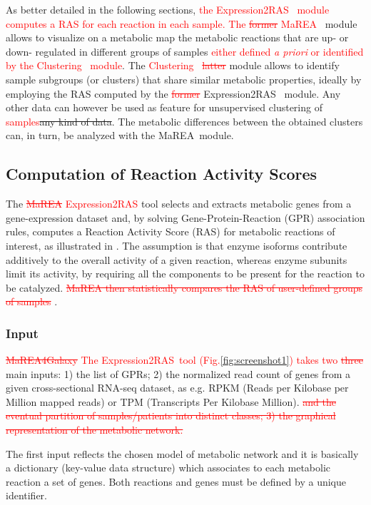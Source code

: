 \documentclass[preprint,12pt,authoryear]{elsarticle}
\newcommand{\red}{\textcolor{red}}
\newcommand{\mareagalaxy}{\textsf{MaREA4Galaxy}}
\newcommand{\mareaTool}{\textsf{MaREA}}
\newcommand{\clusterTool}{\textsf{Clustering}}
\newcommand{\RASTool}{\textsf{Expression2RAS}}
\begin{document}
As better detailed in the following sections, \red{the \RASTool~
  module computes a RAS for each reaction in each sample. The
  \sout{former} \mareaTool~} module allows to visualize on a metabolic
map the metabolic reactions that are up- or down- regulated in
different groups of samples \red{either defined \textit{a priori} or
  identified by the \clusterTool~ module}. The \red{\clusterTool~
  \sout{latter}} module allows to identify sample subgroups (or
clusters) that share similar metabolic properties, ideally by
employing the RAS computed by the \red{\sout{former}} \RASTool~
module. Any other data can however be used as feature for unsupervised
clustering of \textcolor{red}{samples}\sout{any kind of data}. The
metabolic differences between the obtained clusters can, in turn, be
analyzed with the \mareaTool~module.


\subsection{Computation of Reaction Activity Scores}

The \red{\sout{\mareaTool} \RASTool} tool selects and extracts
metabolic genes from a gene-expression dataset and, by solving
Gene-Protein-Reaction (GPR) association rules, computes a Reaction
Activity Score (RAS) for metabolic reactions of interest, as
illustrated in \citep{marea}. The assumption is that enzyme isoforms
contribute additively to the overall activity of a given reaction,
whereas enzyme subunits limit its activity, by requiring all the
components to be present for the reaction to be catalyzed.
%
\red{\sout{\textsf{MaREA} then statistically compares the RAS of
    user-defined groups of samples}} \citep{marea}.


\subsubsection{Input}

\red{\sout{\mareagalaxy} The \RASTool\ tool
  (Fig.\ref{fig:screenshot1}) takes two \sout{three}} main inputs: 1)
the list of GPRs; 2) the normalized read count of genes from a given
cross-sectional RNA-seq dataset, as e.g. RPKM (Reads per Kilobase per
Million mapped reads) or TPM (Transcripts Per Kilobase
Million). \red{\sout{and the eventual partition of samples/patients
    into distinct classes; 3) the graphical representation of the
    metabolic network.}}

The first input reflects the chosen model of metabolic network and it
is basically a dictionary (key-value data structure) which associates
to each metabolic reaction a set of genes. Both reactions and genes
must be defined by a unique identifier.
\end{document}
